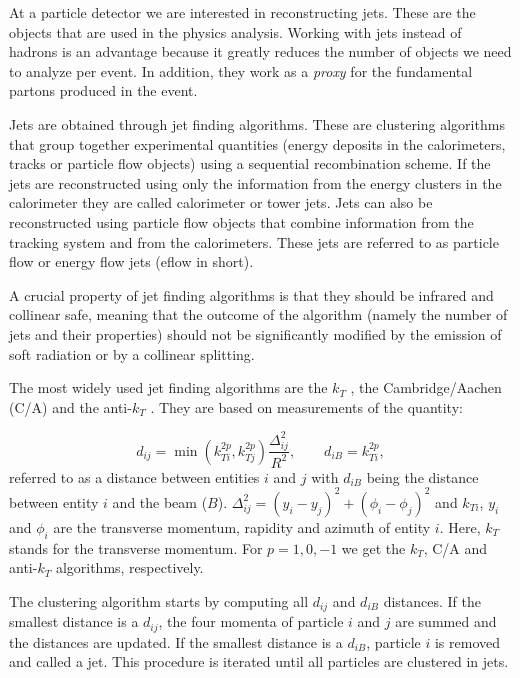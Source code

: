 At a particle detector we are interested in reconstructing jets. These are the objects that are used in the physics analysis. Working with jets instead of hadrons is an advantage because it greatly reduces the number of objects we need to analyze per event. In addition, they work as a \textit{proxy} for the fundamental partons produced in the event.

Jets are obtained through jet finding algorithms. These are clustering algorithms that group together experimental quantities (energy deposits in the calorimeters, tracks or particle flow objects) using a sequential recombination scheme. If the jets are reconstructed using only the information from the energy clusters in the calorimeter they are called calorimeter or tower jets. Jets can also be reconstructed using particle flow objects that combine information from the tracking system and from the calorimeters. These jets are referred to as particle flow or energy flow jets (eflow in short).

A crucial property of jet finding algorithms is that they should be infrared and collinear safe, meaning that the outcome of the algorithm (namely the number of jets and their properties) should not be significantly
modified by the emission of soft radiation or by a collinear splitting.

The most widely used jet finding algorithms are the $k_T$ \cite{kt}, the Cambridge/Aachen (C/A) \cite{CA} and the anti-$k_T$ \cite{anti-kt}. They are based on measurements of the quantity:

\begin{equation}
d_{ij}=\min(k_{Ti}^{2p},k_{Tj}^{2p})\frac{\Delta_{ij}^2}{R^2}, \qquad
d_{iB}=k_{Ti}^{2p},
\end{equation}
referred to as a distance between entities $i$ and $j$ with $d_{iB}$ being the distance between entity $i$ and the beam ($B$). $\Delta_{ij}^2=(y_i-y_j)^2+(\phi_i-\phi_j)^2$ and $k_{Ti}$, $y_i$ and $\phi_i$ are the transverse momentum, rapidity and azimuth of entity $i$. Here, $k_{T}$ stands for the transverse momentum. For $p=1,0,-1$ we get the $k_T$, C/A and anti-$k_T$ algorithms, respectively.

The clustering algorithm starts by computing all $d_{ij}$ and $d_{iB}$ distances. If the smallest distance is a $d_{ij}$, the four momenta of particle $i$ and $j$ are summed and the distances are updated. If the smallest distance is a $d_{iB}$, particle $i$ is removed and called a jet. This procedure is iterated until all particles are clustered in jets.

